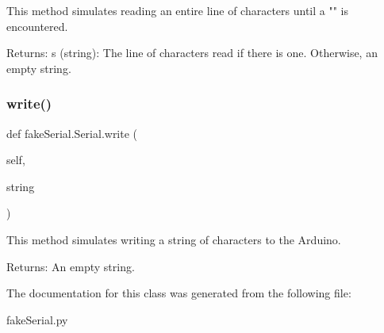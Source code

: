 \begin{DoxyVerb}This method simulates reading an entire line of characters until a "\n" is encountered.

Returns:
    s (string): The line of characters read if there is one. Otherwise, an empty string.
\end{DoxyVerb}
 \mbox{\label{classfake_serial_1_1_serial_abc4ef915d782f9e4a8d1d6f398298a6d}} 
\subsubsection{\texorpdfstring{write()}{write()}}
{\footnotesize\ttfamily def fake\+Serial.\+Serial.\+write (\begin{DoxyParamCaption}\item[{}]{self,  }\item[{}]{string }\end{DoxyParamCaption})}

\begin{DoxyVerb}This method simulates writing a string of characters to the Arduino.

Returns:
    An empty string.
\end{DoxyVerb}
 

The documentation for this class was generated from the following file\+:\begin{DoxyCompactItemize}
\item 
fake\+Serial.\+py\end{DoxyCompactItemize}
